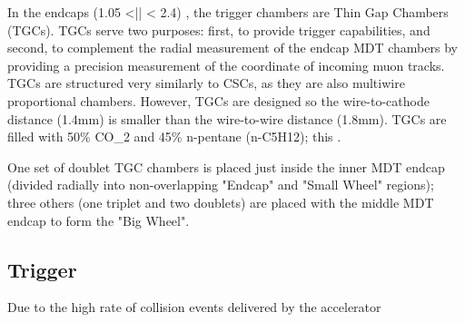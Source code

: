 In the endcaps (1.05 <|\eta| < 2.4) , the trigger chambers are Thin Gap Chambers (TGCs). TGCs serve two purposes: first, to provide trigger capabilities, and second, to complement the radial measurement of the endcap MDT chambers by providing a precision measurement of the \phi coordinate of incoming muon tracks. TGCs are structured very similarly to CSCs, as they are also multiwire proportional chambers. However, TGCs are designed so the wire-to-cathode distance (1.4mm) is smaller than the wire-to-wire distance (1.8mm). TGCs are filled with 50\% CO_2 and 45\% n-pentane (n-C5H12); this .

One set of doublet TGC chambers is placed just inside the inner MDT endcap (divided radially into non-overlapping "Endcap" and "Small Wheel" regions); three others (one triplet and two doublets) are placed with the middle MDT endcap to form the "Big Wheel".


\subsection{Trigger} \label{sec:Trigger}
Due to the high rate of collision events delivered by the accelerator 
